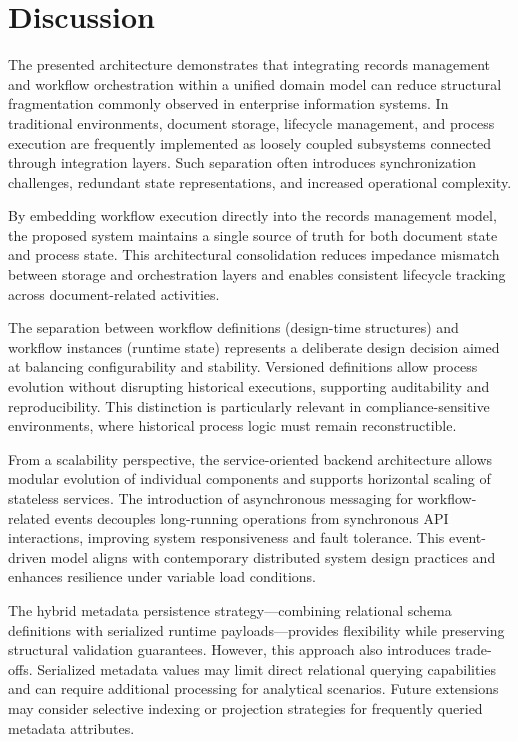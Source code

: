 ﻿%
\section{Discussion}

The presented architecture demonstrates that integrating records management and workflow orchestration within a unified domain model can reduce structural fragmentation commonly observed in enterprise information systems. 
In traditional environments, document storage, lifecycle management, and process execution are frequently implemented as loosely coupled subsystems connected through integration layers. 
Such separation often introduces synchronization challenges, redundant state representations, and increased operational complexity.

By embedding workflow execution directly into the records management model, the proposed system maintains a single source of truth for both document state and process state. 
This architectural consolidation reduces impedance mismatch between storage and orchestration layers and enables consistent lifecycle tracking across document-related activities.

The separation between workflow definitions (design-time structures) and workflow instances (runtime state) represents a deliberate design decision aimed at balancing configurability and stability. 
Versioned definitions allow process evolution without disrupting historical executions, supporting auditability and reproducibility. 
This distinction is particularly relevant in compliance-sensitive environments, where historical process logic must remain reconstructible.

From a scalability perspective, the service-oriented backend architecture allows modular evolution of individual components and supports horizontal scaling of stateless services. 
The introduction of asynchronous messaging for workflow-related events decouples long-running operations from synchronous API interactions, improving system responsiveness and fault tolerance. 
This event-driven model aligns with contemporary distributed system design practices and enhances resilience under variable load conditions.

The hybrid metadata persistence strategy—combining relational schema definitions with serialized runtime payloads—provides flexibility while preserving structural validation guarantees. 
However, this approach also introduces trade-offs. 
Serialized metadata values may limit direct relational querying capabilities and can require additional processing for analytical scenarios. 
Future extensions may consider selective indexing or projection strategies for frequently queried metadata attributes.

